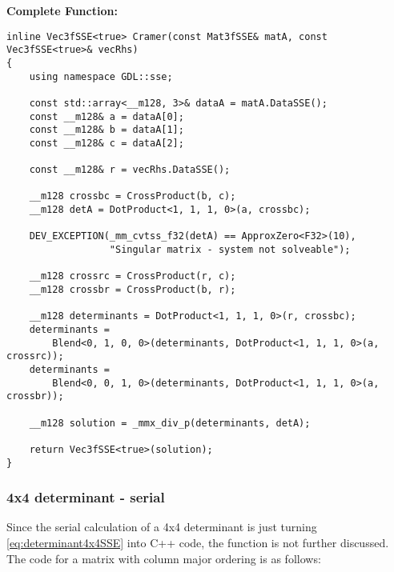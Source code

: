 \vspace{1cm}
\textbf{Complete Function:}

\begin{verbatim}
inline Vec3fSSE<true> Cramer(const Mat3fSSE& matA, const Vec3fSSE<true>& vecRhs)
{
    using namespace GDL::sse;

    const std::array<__m128, 3>& dataA = matA.DataSSE();
    const __m128& a = dataA[0];
    const __m128& b = dataA[1];
    const __m128& c = dataA[2];

    const __m128& r = vecRhs.DataSSE();

    __m128 crossbc = CrossProduct(b, c);
    __m128 detA = DotProduct<1, 1, 1, 0>(a, crossbc);

    DEV_EXCEPTION(_mm_cvtss_f32(detA) == ApproxZero<F32>(10), 
                  "Singular matrix - system not solveable");

    __m128 crossrc = CrossProduct(r, c);
    __m128 crossbr = CrossProduct(b, r);

    __m128 determinants = DotProduct<1, 1, 1, 0>(r, crossbc);
    determinants = 
        Blend<0, 1, 0, 0>(determinants, DotProduct<1, 1, 1, 0>(a, crossrc));
    determinants = 
        Blend<0, 0, 1, 0>(determinants, DotProduct<1, 1, 1, 0>(a, crossbr));

    __m128 solution = _mmx_div_p(determinants, detA);

    return Vec3fSSE<true>(solution);
}
\end{verbatim}




\newpage
\subsubsection{4x4 determinant - serial}
\label{sec:determinant4x4Serial}

Since the serial calculation of a 4x4 determinant is just turning \cref{eq:determinant4x4SSE} into C++ code, the function is not further discussed.
The code for a matrix with column major ordering is as follows:

